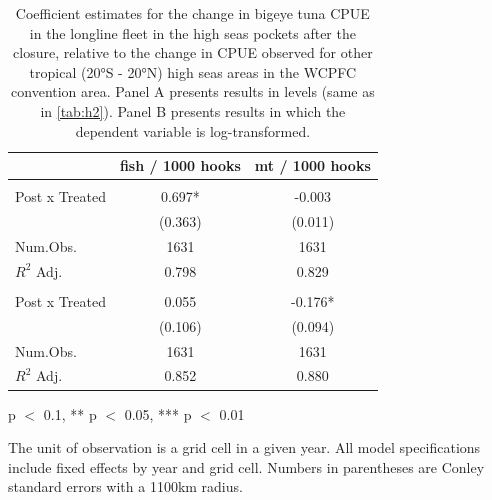 \begin{table}
\centering
\begin{threeparttable}
\small
\caption{\label{tab:h2_reg_bet}Coefficient estimates for the change in bigeye
             tuna CPUE in the longline fleet in the high seas pockets after
             the closure, relative to the change in CPUE observed for other tropical
             (20°S - 20°N) high seas areas in the WCPFC convention area.
             Panel A presents results in levels (same as in \autoref{tab:h2}).
             Panel B presents results in
             which the dependent variable is log-transformed.}
\centering
\begin{tabular}[t]{lcc}
\toprule
  & fish / 1000 hooks & mt / 1000 hooks\\
\midrule
\addlinespace[0.5em]
\multicolumn{3}{l}{\textit{A) Levels}}\\
\midrule \hspace{1em}Post x Treated & 0.697* & -0.003\\
\hspace{1em} & (0.363) & (0.011)\\
\hspace{1em}Num.Obs. & 1631 & \vphantom{1} 1631\\
\hspace{1em}$R^2$ Adj. & 0.798 & 0.829\\
\addlinespace[0.5em]
\multicolumn{3}{l}{\textit{B) Log-transformed}}\\
\midrule \hspace{1em}Post x Treated & 0.055 & -0.176*\\
\hspace{1em} & (0.106) & (0.094)\\
\hspace{1em}Num.Obs. & 1631 & 1631\\
\hspace{1em}$R^2$ Adj. & 0.852 & 0.880\\
\bottomrule
\end{tabular}
\begin{tablenotes}
\small
\item * p $<$ 0.1, ** p $<$ 0.05, *** p $<$ 0.01
\item The unit of observation is a grid cell in a given year. All model specifications include fixed effects by year and grid cell. Numbers in parentheses are Conley standard errors with a 1100km radius.
\end{tablenotes}
\end{threeparttable}
\end{table}
